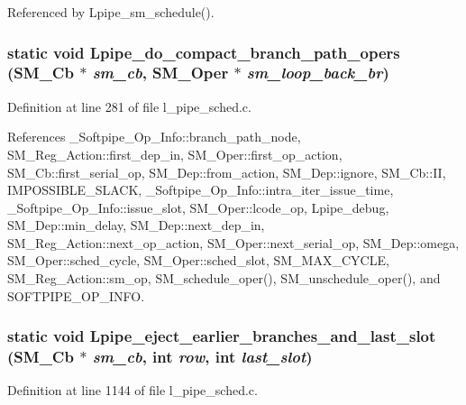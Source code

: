 Referenced by Lpipe\_\-sm\_\-schedule().
\subsubsection{\setlength{\rightskip}{0pt plus 5cm}static void Lpipe\_\-do\_\-compact\_\-branch\_\-path\_\-opers (\bf{SM\_\-Cb} $\ast$ {\em sm\_\-cb}, \bf{SM\_\-Oper} $\ast$ {\em sm\_\-loop\_\-back\_\-br})\hspace{0.3cm}{\tt  [static]}}\label{l__pipe__sched_8c_22d3a9898c3e6ce8efa572c7ac22c115}




Definition at line 281 of file l\_\-pipe\_\-sched.c.

References \_\-Softpipe\_\-Op\_\-Info::branch\_\-path\_\-node, SM\_\-Reg\_\-Action::first\_\-dep\_\-in, SM\_\-Oper::first\_\-op\_\-action, SM\_\-Cb::first\_\-serial\_\-op, SM\_\-Dep::from\_\-action, SM\_\-Dep::ignore, SM\_\-Cb::II, IMPOSSIBLE\_\-SLACK, \_\-Softpipe\_\-Op\_\-Info::intra\_\-iter\_\-issue\_\-time, \_\-Softpipe\_\-Op\_\-Info::issue\_\-slot, SM\_\-Oper::lcode\_\-op, Lpipe\_\-debug, SM\_\-Dep::min\_\-delay, SM\_\-Dep::next\_\-dep\_\-in, SM\_\-Reg\_\-Action::next\_\-op\_\-action, SM\_\-Oper::next\_\-serial\_\-op, SM\_\-Dep::omega, SM\_\-Oper::sched\_\-cycle, SM\_\-Oper::sched\_\-slot, SM\_\-MAX\_\-CYCLE, SM\_\-Reg\_\-Action::sm\_\-op, SM\_\-schedule\_\-oper(), SM\_\-unschedule\_\-oper(), and SOFTPIPE\_\-OP\_\-INFO.
\subsubsection{\setlength{\rightskip}{0pt plus 5cm}static void Lpipe\_\-eject\_\-earlier\_\-branches\_\-and\_\-last\_\-slot (\bf{SM\_\-Cb} $\ast$ {\em sm\_\-cb}, int {\em row}, int {\em last\_\-slot})\hspace{0.3cm}{\tt  [static]}}\label{l__pipe__sched_8c_ab04f61e01f3019bf9d52500cbf990a0}




Definition at line 1144 of file l\_\-pipe\_\-sched.c.

